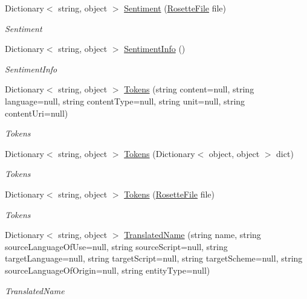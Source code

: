 \begin{DoxyCompactItemize}
Dictionary$<$ string, object $>$ \hyperlink{classrosette__api_1_1_c_a_p_i_a35ab561303c1d997fb22635942523a6c}{Sentiment} (\hyperlink{classrosette__api_1_1_rosette_file}{Rosette\+File} file)
\begin{DoxyCompactList}\small\item\em Sentiment \end{DoxyCompactList}\item 
Dictionary$<$ string, object $>$ \hyperlink{classrosette__api_1_1_c_a_p_i_aef053823a3490b2cc15b4aa040d72508}{Sentiment\+Info} ()
\begin{DoxyCompactList}\small\item\em Sentiment\+Info \end{DoxyCompactList}\item 
Dictionary$<$ string, object $>$ \hyperlink{classrosette__api_1_1_c_a_p_i_a0bea36c60aaf9271927b81e38613a401}{Tokens} (string content=null, string language=null, string content\+Type=null, string unit=null, string content\+Uri=null)
\begin{DoxyCompactList}\small\item\em Tokens \end{DoxyCompactList}\item 
Dictionary$<$ string, object $>$ \hyperlink{classrosette__api_1_1_c_a_p_i_a2d1fabbeff31fb0e57527b7729255fed}{Tokens} (Dictionary$<$ object, object $>$ dict)
\begin{DoxyCompactList}\small\item\em Tokens \end{DoxyCompactList}\item 
Dictionary$<$ string, object $>$ \hyperlink{classrosette__api_1_1_c_a_p_i_a7e66399baa757fe6baa676419660fdd8}{Tokens} (\hyperlink{classrosette__api_1_1_rosette_file}{Rosette\+File} file)
\begin{DoxyCompactList}\small\item\em Tokens \end{DoxyCompactList}\item 
Dictionary$<$ string, object $>$ \hyperlink{classrosette__api_1_1_c_a_p_i_a58db505790eb9d805650df07b0850b04}{Translated\+Name} (string name, string source\+Language\+Of\+Use=null, string source\+Script=null, string target\+Language=null, string target\+Script=null, string target\+Scheme=null, string source\+Language\+Of\+Origin=null, string entity\+Type=null)
\begin{DoxyCompactList}\small\item\em Translated\+Name \end{DoxyCompactList}\item 

\end{DoxyCompactItemize}

